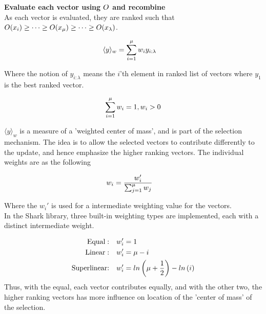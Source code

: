 \textbf{Evaluate each vector using $O$ and recombine}\\
As each vector is evaluated, they are ranked such that
$O{ \left( x_{i} \right) } \geq \dots \geq O{ \left( x_{\mu} \right)} \geq \dots \geq O{ \left( x_{\lambda} \right)}$.

\begin{align}
\langle y \rangle_{w} &= \sum^{\mu}_{i = 1}w_{i} y_{i : \lambda}
\end{align}

Where the notion of $y_{i : \lambda}$ means the $i$'th element in ranked list of vectors
where $y_1$ is the best ranked vector.

\begin{align}
\sum^{\mu}_{i = 1} w_{i} = 1, w_{i} > 0
\end{align}

$\langle y \rangle_{w}$ is a measure of a 'weighted center of mass',
and is part of the selection mechanism. The idea is to allow the selected vectors
to contribute differently to the update, and hence emphasize the higher 
ranking vectors. The individual weights are as the following

\begin{align}
w_i &= \frac{w_{i}'}{\sum^{\mu}_{j=1} w_j }
\end{align}

Where the $w_i'$ is used for a intermediate weighting value for the vectors.\\
In the Shark library, three built-in weighting types are implemented, each with
a distinct intermediate weight.

\begin{align}
\text{Equal}: &\quad w_i' = 1 \label{eq:recomType}\\
\text{Linear}: &\quad  w_i' = \mu - i\\
\text{Superlinear:} &\quad w_i' = ln \left( \mu + \frac{1}{2} \right)
- ln \left( i \right)
\end{align}
Thus, with the equal, each vector contributes equally, and with the other two, the 
higher ranking vectors has more influence on location of the 'center of mass' of 
the selection.

